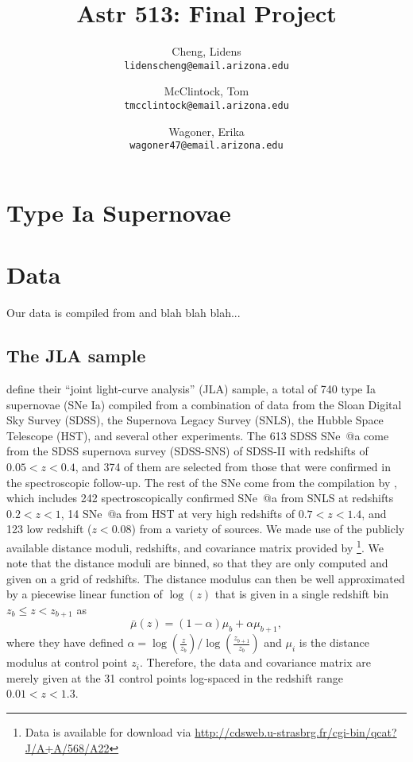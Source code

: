 \documentclass[12pt,a4paper]{article}
\author{
  Cheng, Lidens\\
  \texttt{lidenscheng@email.arizona.edu}
  \and
  McClintock, Tom\\
  \texttt{tmcclintock@email.arizona.edu}
  \and
  Wagoner, Erika\\
  \texttt{wagoner47@email.arizona.edu}
}
\title{Astr 513: Final Project}
\makeatletter
\newcommand*{\rom}[1]{\expandafter\@slowromancap\romannumeral #1@}
\newcommand{\sne}{\mbox{SNe}}
\newcommand{\snea}{\mbox{SNe \rom{1}a}}
\makeatother
\begin{document}
\maketitle

\section{Type Ia Supernovae}

\section{Data}
\label{sec:data}

Our data is compiled from \citet{betoule2014} and \citet{rest2014} blah blah blah...

\subsection{The JLA sample}
\label{sec:betoule}

\citet{betoule2014} define their ``joint light-curve analysis'' (JLA) sample, a total of 740 type Ia supernovae (SNe Ia) %
 compiled from a combination of data from the Sloan Digital Sky Survey (SDSS), the Supernova Legacy Survey (SNLS), the Hubble Space Telescope (HST), and several other experiments. The 613 SDSS \snea{} come from the SDSS supernova survey (SDSS-SNS) of SDSS-II \citep{sako2014} with redshifts of $0.05 < z < 0.4$, and 374 of them are selected from those that were confirmed in the spectroscopic follow-up. The rest of the \sne{} come from the compilation by \citet{conley2011}, which includes 242 spectroscopically confirmed \snea{} from SNLS at redshifts $0.2 < z < 1$, 14 \snea{} from HST at very high redshifts of $0.7 < z < 1.4$, and 123 low redshift ($z < 0.08$) from a variety of sources. We made use of the publicly available distance moduli, redshifts, and covariance matrix provided by \citet{betoule2014}\footnote{Data is available for download via \url{http://cdsweb.u-strasbrg.fr/cgi-bin/qcat?J/A+A/568/A22}}. We note that the distance moduli are binned, so that they are only computed and given on a grid of redshifts. The distance modulus can then be well approximated by a piecewise linear function of $\log(z)$ that is given in a single redshift bin $z_b \le z < z_{b+1}$ as \citep[see][Appendix E.1]{betoule2014}
\begin{equation}
\label{eq:binnedMu}
\bar{\mu}(z) = (1 - \alpha) \mu_b + \alpha \mu_{b+1},
\end{equation}
where they have defined $\alpha = \log\left(\frac{z}{z_b}\right)/\log\left(\frac{z_{b+1}}{z_b}\right)$ and $\mu_i$ is the distance modulus at control point $z_i$. Therefore, the data and covariance matrix are merely given at the 31 control points log-spaced in the redshift range $0.01 < z < 1.3$.

%


\end{document}
